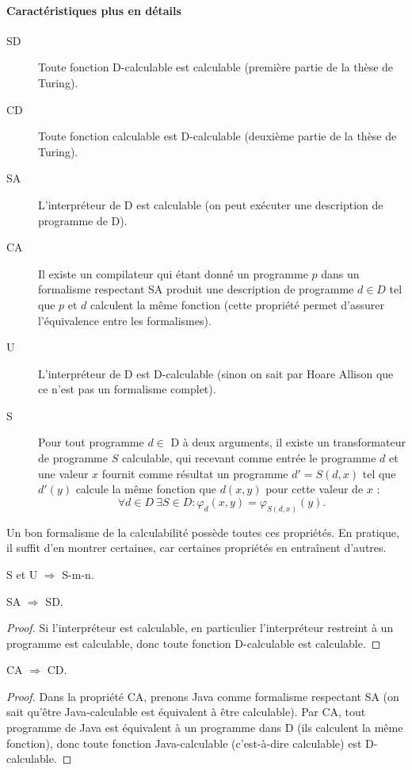 \paragraph{Caractéristiques plus en détails}
\begin{description}
	\item[SD]  Toute fonction D-calculable est calculable (première partie de la thèse de Turing).
	\item[CD]  Toute fonction calculable est D-calculable (deuxième partie de la thèse de Turing).
	\item[SA]  L'interpréteur de D est calculable (on peut exécuter une description de programme de D).
	\item[CA]  Il existe un compilateur qui étant donné un programme $p$ dans un formalisme respectant SA produit une description de programme $d \in D$ tel que $p$ et $d$ calculent la même fonction (cette propriété permet d'assurer l'équivalence entre les formalismes).
	\item[U]  L'interpréteur de D est D-calculable (sinon on sait par Hoare Allison que ce n'est pas un formalisme complet).
	\item[S] Pour tout programme $d \in$ D à deux arguments, il existe un transformateur de 
  programme $S$ calculable, qui 
  recevant comme entrée le programme $d$ et une valeur 
  $x$ fournit comme résultat un programme $d'=S(d,x)$ tel que $d'(y)$ calcule 
  la même fonction que $d(x,y)$ pour cette valeur de $x$ :
$$\forall d\in D\ \exists S\in D \colon \varphi_d(x,y)=\varphi_{S(d,x)}(y).$$
\end{description}
Un bon formalisme de la calculabilité possède toutes ces propriétés. En pratique, il suffit d'en montrer certaines, car certaines propriétés en entraînent d'autres.

\begin{myprop}
S et U $\Rightarrow$ S-m-n.
\end{myprop}

\begin{myprop}
SA $\Rightarrow$ SD.
    
\begin{proof}
Si l'interpréteur est calculable, en particulier l'interpréteur restreint à un programme est calculable, donc toute fonction D-calculable est calculable.
\end{proof}
\end{myprop}

\begin{myprop}
CA $\Rightarrow$ CD.
    
\begin{proof}
Dans la propriété CA, prenons Java comme formalisme respectant SA (on sait qu'être Java-calculable est équivalent à être calculable). Par CA, tout programme de Java est équivalent à un programme dans D (ils calculent la même fonction), donc toute fonction Java-calculable (c'est-à-dire calculable) est D-calculable.
\end{proof}
\end{myprop}


